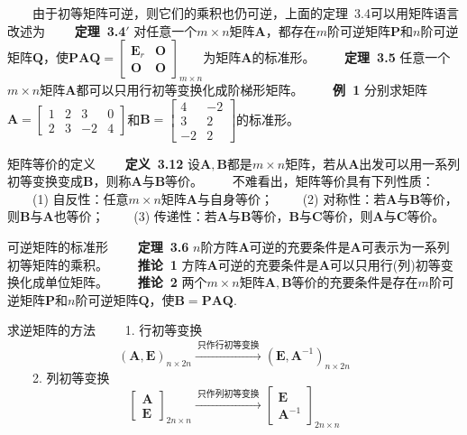 \documentclass[compress,mathserif,cjk]{beamer}
\theoremstyle{remark}
\numberwithin{equation}{section}
\newcommand{\hei}{\bf}      %
\begin{document}
\begin{CJK}{UTF8}{gbsn}
\begin{frame}
\ \ \ \ 由于初等矩阵可逆，则它们的乘积也仍可逆，上面的定理~3.4可以用矩阵语言改述为
\vskip 5pt
\ \ \ \ {\hei 定理~3.4$'$} 对任意一个$m\times n$矩阵$\bm A$，都存在$m$阶可逆矩阵$\bm P$和$n$阶可逆矩阵$\bm Q$，使$\bm{PAQ}=\left[\begin{matrix}\bm E_r&\bm O\\\bm O&\bm O\end{matrix}\right]_{m\times n}$为矩阵$\bm A$的标准形。
\pause\vskip 10pt
\ \ \ \ {\hei 定理~3.5} 任意一个$m\times n$矩阵$\bm A$都可以只用行初等变换化成阶梯形矩阵。
\pause\vskip 10pt
\ \ \ \ {\hei 例~1} 分别求矩阵$\bm A=\left[\begin{matrix}1&2&3&0\\2&3&-2&4\end{matrix}\right]$和$\bm B=\left[\begin{matrix}4&-2\\3&2\\-2&2\end{matrix}\right]$的标准形。

\end{frame}

\begin{frame}{矩阵等价的定义}
\ \ \ \ {\hei 定义~3.12} 设$\bm A,\bm B$都是$m\times n$矩阵，若从$\bm A$出发可以用一系列初等变换变成$\bm B$，则称$\bm A$与$\bm B$等价。
\pause\vskip 10pt
\ \ \ \ 不难看出，矩阵等价具有下列性质：
\vskip 5pt
\ \ \ \ (1) 自反性：任意$m\times n$矩阵$\bm A$与自身等价；
\vskip 5pt
\ \ \ \ (2) 对称性：若$\bm A$与$\bm B$等价，则$\bm B$与$\bm A$也等价；
\vskip 5pt
\ \ \ \ (3) 传递性：若$\bm A$与$\bm B$等价，$\bm B$与$\bm C$等价，则$\bm A$与$\bm C$等价。


\end{frame}

\begin{frame}{可逆矩阵的标准形}
\ \ \ \ {\hei 定理~3.6} $n$阶方阵$\bm A$可逆的充要条件是$\bm A$可表示为一系列初等矩阵的乘积。
\pause\vskip 10pt
\ \ \ \ {\hei 推论~1} 方阵$\bm A$可逆的充要条件是$\bm A$可以只用行(列)初等变换化成单位矩阵。
\pause\vskip 10pt
\ \ \ \ {\hei 推论~2} 两个$m\times n$矩阵$\bm A,\bm B$等价的充要条件是存在$m$阶可逆矩阵$\bm P$和$n$阶可逆矩阵$\bm Q$，使$\bm B=\bm{PAQ}$.

\end{frame}

\begin{frame}{求逆矩阵的方法}
\ \ \ \ 1. 行初等变换
$$(\bm A,\bm E)_{n\times 2n}\xrightarrow{~\mbox{只作行初等变换}~}(\bm E,\bm A^{-1})_{n\times 2n}$$
\pause\vskip 10pt
\ \ \ \ 2. 列初等变换
$$\left[\begin{matrix}\bm A\\\bm E\end{matrix}\right]_{2n\times n}\xrightarrow{~\mbox{只作列初等变换}~}\left[\begin{matrix}\bm E\ \ \ \ \\\bm A^{-1}\end{matrix}\right]_{2n\times n}$$


\end{frame}
\end{CJK}
\end{document}
